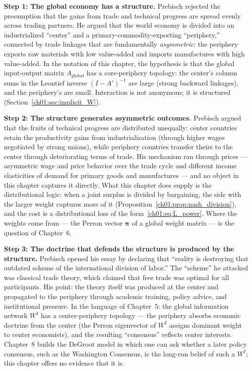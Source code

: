 \documentclass[../structural_economics_book.tex]{subfiles}
\begin{document}
\textbf{Step 1: The global economy has a structure.} Prebisch rejected the presumption that the gains from trade and technical progress are spread evenly across trading partners. He argued that the world economy is divided into an industrialized ``center'' and a primary-commodity-exporting ``periphery,'' connected by trade linkages that are fundamentally \textit{asymmetric}: the periphery exports raw materials with low value-added and imports manufactures with high value-added. In the notation of this chapter, the hypothesis is that the global input-output matrix $A_{\text{global}}$ has a core-periphery topology: the center's column sums in the Leontief inverse $(I - A')^{-1}$ are large (strong backward linkages), and the periphery's are small. Interaction is not anonymous; it is structured (Section~\ref{ch01:sec:implicit_W}).

\textbf{Step 2: The structure generates asymmetric outcomes.} Prebisch argued that the fruits of technical progress are distributed unequally: center countries retain the productivity gains from industrialization (through higher wages negotiated by strong unions), while periphery countries transfer theirs to the center through deteriorating terms of trade. His mechanism ran through prices --- asymmetric wage and price behavior over the trade cycle and different income elasticities of demand for primary goods and manufactures --- and no object in this chapter captures it directly. What this chapter does supply is the distributional logic: when a joint surplus is divided by bargaining, the side with the larger weight captures more of it (Proposition~\ref{ch01:prop:nash_division}), and the cost is a distributional loss of the form~\eqref{ch01:eq:L_power}. Where the weights come from --- the Perron vector $\boldsymbol{\pi}$ of a global weight matrix --- is the question of Chapter~6.

\textbf{Step 3: The doctrine that defends the structure is produced by the structure.} Prebisch opened his essay by declaring that ``reality is destroying that outdated scheme of the international division of labor.'' The ``scheme'' he attacked was classical trade theory, which claimed that free trade was optimal for all participants. His point: the theory itself was produced at the center and propagated to the periphery through academic training, policy advice, and institutional pressure. In the language of Chapter~5: the global information network $W^I$ has a center-periphery topology --- the periphery absorbs economic doctrine from the center (the Perron eigenvector of $W^I$ assigns dominant weight to center economists), and the resulting ``consensus'' reflects center interests. Chapter~8 builds the DeGroot model in which one can ask whether a later policy consensus, such as the Washington Consensus, is the long-run belief of such a $W^I$; this chapter offers no evidence that it is.
\end{document}
